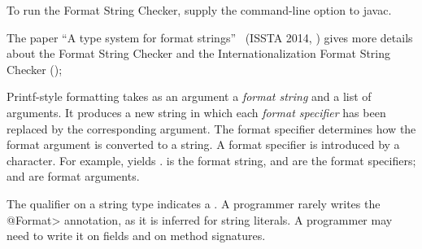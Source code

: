 \begin{sloppypar}
To run the Format String Checker, supply the
 command-line option to javac.
\end{sloppypar}

The paper ``A type system for format strings''~\cite{WeitzKSE2014} (ISSTA
2014,
)
gives more details about the Format String Checker and the Internationalization Format
String Checker ();



Printf-style formatting takes as an argument a \emph{format string} and a
list of arguments.  It produces a new string in which each \emph{format
  specifier} has been replaced by the corresponding argument.
The format specifier determines how the format argument is converted to a
string.
A format specifier is introduced by a \code{\%} character. For example,
 yields
.   is
the format string,  and  are the format specifiers;
 and  are format arguments.



The  qualifier on a string type
indicates a
.
A programmer rarely writes the \<@Format> annotation, as it is inferred for
string literals.  A programmer may need to write it on fields and on method
signatures.


